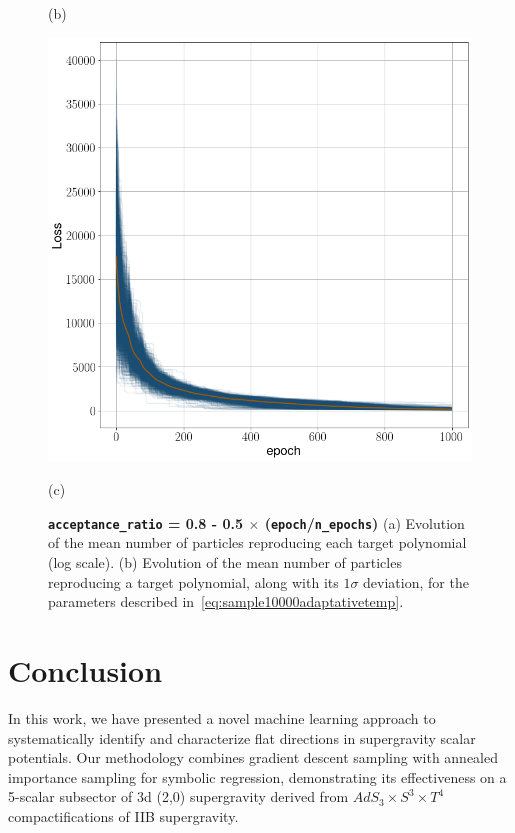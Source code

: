 \documentclass[11pt]{article}
\begin{document}
\begin{figure}[h!]
\begin{adjustbox}{width=20cm,center}
\begin{minipage}[t]{0.31\paperwidth}
			\caption*{(b)}
		\end{minipage}%
		\hfill
		\begin{minipage}[t]{0.31\paperwidth}
			\centering
			\includegraphics[width=\linewidth]{Figures/Loss_all_ASMC.png}
			\caption*{(c)}
		\end{minipage}
	\end{adjustbox}
	\caption{{\bfseries \boldmath \texttt{acceptance\_ratio} = 0.8 - 0.5 $\times$ (\texttt{epoch}/\texttt{n\_epochs})} (a) Evolution of the mean number of particles reproducing each target polynomial (log scale). (b) Evolution of the mean number of particles reproducing a target polynomial, along with its $1\sigma$ deviation, for the parameters described in~\eqref{eq:sample10000adaptativetemp}.}
	\label{fig:evolutionoftargetreproduction}
\end{figure}


\section{Conclusion}

In this work, we have presented a novel machine learning approach to systematically identify and characterize flat directions in supergravity scalar potentials. Our methodology combines gradient descent sampling with annealed importance sampling for symbolic regression, demonstrating its effectiveness on a 5-scalar subsector of 3d (2,0) supergravity derived from 
$AdS_3 \times S^3 \times T^4$ compactifications of IIB supergravity.
\end{document}

